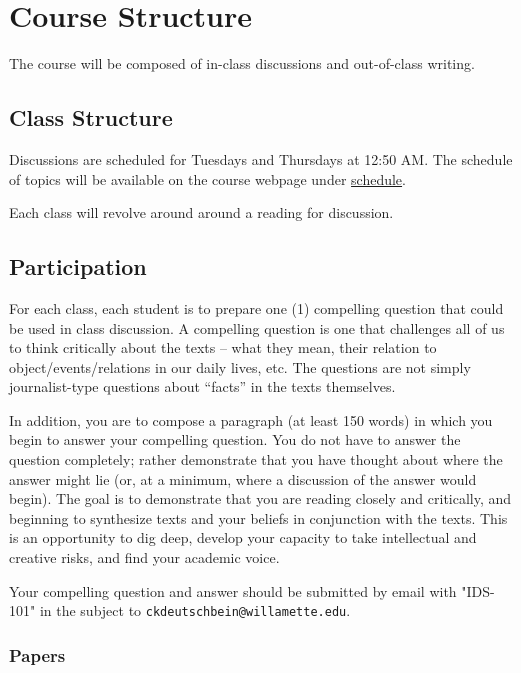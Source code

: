 \documentclass[11pt]{article}
\begin{document}

\section*{Course Structure}

The course will be composed of in-class discussions and out-of-class writing.

\subsection*{Class Structure}

Discussions are scheduled for Tuesdays and Thursdays at 12:50 AM. The schedule
of topics will be available on the course webpage under \href{https://cd-public.github.io/courses/soc/sched.html}{schedule}.

Each class will revolve around around a reading for discussion.


\subsection*{Participation}

For each class, each student is to prepare one (1)
compelling question that could be used in class discussion. A compelling question is one that challenges
all of us to think critically about the texts – what they mean, their relation to object/events/relations in our
daily lives, etc. The questions are not simply journalist-type questions about “facts” in the texts
themselves.

In addition, you are to compose a paragraph (at least 150 words) in which you begin to answer your
compelling question. You do not have to answer the question completely; rather demonstrate that you
have thought about where the answer might lie (or, at a minimum, where a discussion of the answer
would begin). The goal is to demonstrate that you are reading closely and critically, and beginning to
synthesize texts and your beliefs in conjunction with the texts. This is an opportunity to dig deep, develop
your capacity to take intellectual and creative risks, and find your academic voice.

Your compelling question and answer should be submitted by email with
"IDS-101" in the subject to \texttt{ckdeutschbein@willamette.edu}.

\subsubsection*{Papers}
\end{document}
